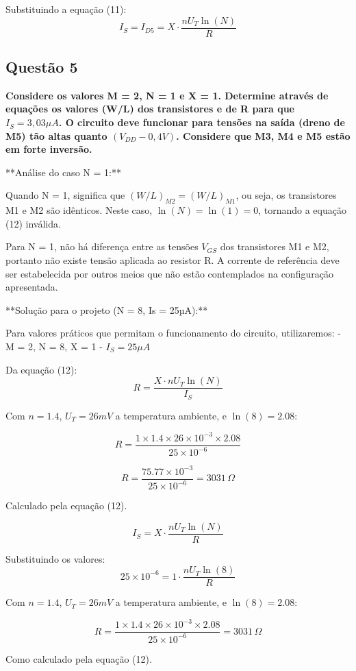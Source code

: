 \documentclass[12pt,a4paper]{article}
\begin{document}
Substituindo a equação (11):
$$I_S = I_{D5} = X \cdot \frac{nU_T \ln(N)}{R} $$

\subsection*{Questão 5}

\textbf{Considere os valores M = 2, N = 1 e X = 1. Determine através de equações os valores (W/L) dos transistores e de R para que $I_S = 3,03 \mu A$. O circuito deve funcionar para tensões na saída (dreno de M5) tão altas quanto $(V_{DD} - 0,4V)$. Considere que M3, M4 e M5 estão em forte inversão.}

**Análise do caso N = 1:**

Quando N = 1, significa que $(W/L)_{M2} = (W/L)_{M1}$, ou seja, os transistores M1 e M2 são idênticos. Neste caso, $\ln(N) = \ln(1) = 0$, tornando a equação (12) inválida.

Para N = 1, não há diferença entre as tensões $V_{GS}$ dos transistores M1 e M2, portanto não existe tensão aplicada ao resistor R. A corrente de referência deve ser estabelecida por outros meios que não estão contemplados na configuração apresentada.

**Solução para o projeto (N = 8, Is = 25µA):**

Para valores práticos que permitam o funcionamento do circuito, utilizaremos:
- M = 2, N = 8, X = 1  
- $I_S = 25 \mu A$

Da equação (12):
$$R = \frac{X \cdot nU_T \ln(N)}{I_S}$$

Com $n = 1.4$, $U_T = 26mV$ a temperatura ambiente, e $\ln(8) = 2.08$:

$$R = \frac{1 \times 1.4 \times 26 \times 10^{-3} \times 2.08}{25 \times 10^{-6}}$$

$$R = \frac{75.77 \times 10^{-3}}{25 \times 10^{-6}} = 3031 \, \Omega$$

Calculado pela equação (12).

$$I_S = X \cdot \frac{nU_T \ln(N)}{R}$$

Substituindo os valores:
$$25 \times 10^{-6} = 1 \cdot \frac{nU_T \ln(8)}{R}$$

Com $n = 1.4$, $U_T = 26mV$ a temperatura ambiente, e $\ln(8) = 2.08$:

$$R = \frac{1 \times 1.4 \times 26 \times 10^{-3} \times 2.08}{25 \times 10^{-6}} = 3031 \, \Omega$$

Como calculado pela equação (12).
\end{document}

